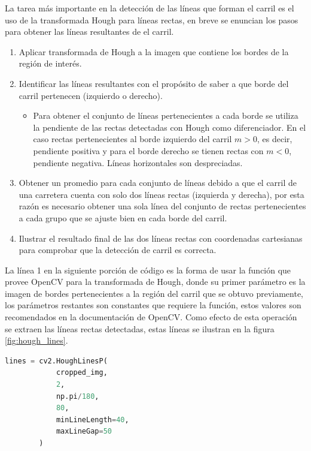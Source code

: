 La tarea más importante en la detección de las líneas que forman el carril es el uso de la transformada Hough para líneas rectas, en breve se enuncian los pasos para obtener las líneas resultantes de el carril.

\begin{enumerate}
    \item Aplicar transformada de Hough a la imagen que contiene los bordes de la región de interés.
    \item Identificar las líneas resultantes con el propósito de saber a que borde del carril pertenecen (izquierdo o derecho).
    \begin{itemize}
        \item Para obtener el conjunto de líneas pertenecientes a cada borde se utiliza la pendiente de las rectas detectadas con Hough como diferenciador. En el caso rectas pertenecientes al borde izquierdo del carril $m > 0$, es decir, pendiente positiva y para el borde derecho se tienen rectas con $m < 0$, pendiente negativa. Líneas horizontales son despreciadas.
    \end{itemize}
    \item Obtener un promedio para cada conjunto de líneas debido a que el carril de una carretera cuenta con solo dos líneas rectas (izquierda y derecha), por esta razón es necesario obtener una sola línea del conjunto de rectas pertenecientes a cada grupo que se ajuste bien en cada borde del carril.
    \item Ilustrar el resultado final de las dos líneas rectas con coordenadas cartesianas para comprobar que la detección de carril es correcta.
\end{enumerate}

La línea 1 en la siguiente porción de código es la forma de usar la función que provee OpenCV para la transformada de Hough, donde su primer parámetro es la imagen de bordes pertenecientes a la región del carril que se obtuvo previamente, los parámetros restantes son constantes que requiere la función, estos valores son recomendados en la documentación de OpenCV. Como efecto de esta operación se extraen las líneas rectas detectadas, estas líneas se ilustran en la figura \ref{fig:hough_lines}.

\hfill
\begin{lstlisting}[language=Python]
lines = cv2.HoughLinesP(
            cropped_img,
            2,
            np.pi/180,
            80,
            minLineLength=40,
            maxLineGap=50
        )
\end{lstlisting}
\hfill

